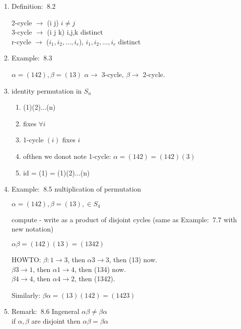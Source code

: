 \documentclass[12pt]{article}
\newcommand{\defi}{{\color{blue} Definition: $\ $}}
\newcommand{\exe}{{\color{green} Example: $\ $}}
\newcommand{\rem}{{\color{blue} Remark: $\ $}}
\begin{document}
\begin{enumerate}
\begin{enumerate}
    \item \defi 8.2 
    
    2-cycle $\rightarrow$ (i j) $i\ne j$ \\
    3-cycle $\rightarrow$ (i j k) i,j,k distinct \\
    r-cycle $\rightarrow$ ($i_1, i_2, \dots, i_r$),  $i_1, i_2, \dots, i_r$ distinct\\

    \item \exe 8.3
    
    $\alpha = (142), \beta = (13)$
    $\alpha \rightarrow$ 3-cycle, $\beta \rightarrow$ 2-cycle.

    \item identity permutation in $S_n$
    
    \begin{enumerate}
        \item (1)(2)$\dots$(n)
        
        \item fixes $\forall i$
        
        \item 1-cycle $(i)$ fixes $i$
        
        \item ofthen we donot note 1-cycle: $\alpha = (142) = (142)(3)$
        
        \item id = (1) = (1)(2)$\dots$(n)
    \end{enumerate}

    \item \exe 8.5 nultiplication of permutation
    
    $\alpha = (142), \beta = (13), \in S_4$

    compute - write as a product of disjoint cycles (same as \exe 7.7 with new notation)

    $\alpha\beta = (142)(13) = (1342)$

    HOWTO: $\beta: 1 \rightarrow 3$, then $\alpha 3 \rightarrow 3$, then (13) now.\\
    $\beta 3 \rightarrow 1$, then $\alpha 1 \rightarrow 4$, then (134) now.\\
    $\beta 4 \rightarrow 4$, then $\alpha 4 \rightarrow 2$, then (1342).

    Similarly: $\beta\alpha = (13)(142) = (1423)$

    \item \rem 8.6
    Ingeneral $\alpha\beta \ne \beta\alpha$\\
    if $\alpha, \beta$ are disjoint then $\alpha\beta  = \beta\alpha$
    \end{enumerate}


\end{enumerate}
\end{document}
